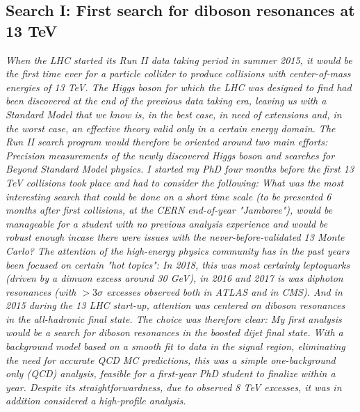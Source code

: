 
\begin{centering}
\section{Search I: First search for diboson resonances at 13 TeV}
\label{searchI}
\textit{
When the LHC started its Run II data taking period in summer 2015, it would be the first time ever for a particle collider to produce collisions with center-of-mass energies of 13 TeV. The Higgs boson for which the LHC was designed to find had been discovered at the end of the previous data taking era, leaving us with a Standard Model that we know is, in the best case, in need of extensions and, in the worst case, an effective theory valid only in a certain energy domain. The Run II search program would therefore be oriented around two main efforts: Precision measurements of the newly discovered Higgs boson and searches for Beyond Standard Model physics.
\newline
\newline
I started my PhD four months before the first 13 TeV collisions took place and had to consider the following:
What was the most interesting search that could be done on a short time scale (to be presented 6 months after first collisions, at the CERN end-of-year "Jamboree"), would be manageable for a student with no previous analysis experience and would be robust enough incase there were issues with the never-before-validated 13 \TeV Monte Carlo?
\newline
\newline
The attention of the high-energy physics community has in the past years been focused on certain "hot topics": In 2018, this was most certainly leptoquarks (driven by a dimuon excess around 30 GeV), in 2016 and 2017 is was diphoton resonances (with  $>3\sigma$ excesses observed both in ATLAS and in CMS). And in 2015 during the 13 \TeV LHC start-up, attention was centered on diboson resonances in the all-hadronic final state. The choice was therefore clear: My first analysis would be a search for diboson resonances in the boosted dijet final state. With a background model based on a smooth fit to data in the signal region, eliminating the need for accurate QCD MC predictions, this was a simple one-background only (QCD) analysis, feasible for a first-year PhD student to finalize within a year. Despite its straightforwardness, due to observed 8 TeV excesses, it was in addition considered a high-profile analysis.
\newline
\newline
}
\end{centering}
